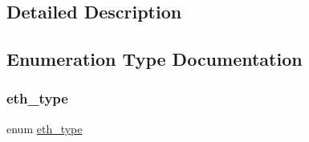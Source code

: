 \subsection{Detailed Description}


\subsection{Enumeration Type Documentation}
\mbox{\label{group__ethernet_ga4f8559808037803168499a3803900339}} 
\subsubsection{\texorpdfstring{eth\+\_\+type}{eth\_type}\hspace{0.1cm}{\footnotesize\ttfamily [1/2]}}
{\footnotesize\ttfamily enum \hyperlink{group__ethernet_ga4f8559808037803168499a3803900339}{eth\+\_\+type}}

